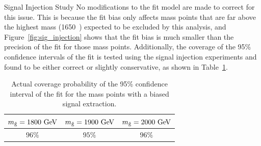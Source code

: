 \begin{subsection}{Signal Injection Study}
No modifications to the fit model are made to correct for this issue.
This is because the fit bias only affects mass points that are far above the highest mass (1650~\GeV) expected to be excluded by this analysis, and Figure~\ref{fig:sig_injection} shows that the fit bias is much smaller than the precision of the fit for those mass points.
Additionally, the coverage of the 95\% confidence intervals of the fit is tested using the signal injection experiments and found to be either correct or slightly conservative, as shown in Table~\ref{tab:siginj_coverage}.

\begin{table}[tbp!]
\centering
\begin{tabular}{ |c|c|c| }
\hline
$m_{\tilde{\mathrm{g}}} = 1800~\mathrm{Ge\kern -0.1em V}$ & $m_{\tilde{\mathrm{g}}} = 1900~\mathrm{Ge\kern -0.1em V}$ & $m_{\tilde{\mathrm{g}}} = 2000~\mathrm{Ge\kern -0.1em V}$ \\ \hline
$96\%$              & $95\%$              & $96\%$              \\ \hline
\end{tabular}
\caption{Actual coverage probability of the 95\% confidence interval of the fit for the mass points with a biased signal extraction.}
\label{tab:siginj_coverage}
\end{table}

\end{subsection}

